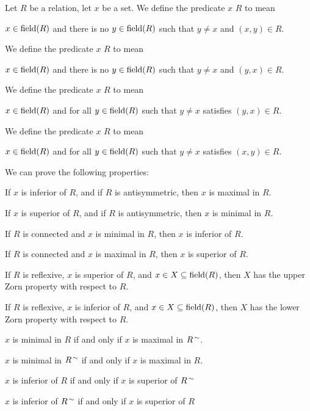 \documentclass{article}
\begin{document}
\begin{definition}%
%
Let $R$ be a relation, let $x$ be a set.
We define the predicate $x$  $R$ to mean
\begin{defn}
\item $x\in\operatorname{field}(R)$ and there is no $y\in\operatorname{field}(R)$ such that $y\neq x$
  and $(x,y)\in R$.
\end{defn}
We define the predicate $x$  $R$ to mean
\begin{defn}
\item $x\in\operatorname{field}(R)$ and there is no $y\in\operatorname{field}(R)$ such that $y\neq x$
  and $(y,x)\in R$.
\end{defn}
We define the predicate $x$  $R$ to mean
\begin{defn}
\item $x\in\operatorname{field}(R)$ and for all $y\in\operatorname{field}(R)$ such that $y\neq x$
  satisfies $(y,x)\in R$.
\end{defn}
We define the predicate $x$  $R$ to mean
\begin{defn}
\item $x\in\operatorname{field}(R)$ and for all $y\in\operatorname{field}(R)$ such that $y\neq x$
  satisfies $(x,y)\in R$.
\end{defn}
\end{definition}

We can prove the following properties:
\begin{thm}
\item\label{orders1:53} If $x$ is inferior of $R$, and if $R$ is
  antisymmetric, then $x$ is maximal in $R$.
\item\label{orders1:54} If $x$ is superior of $R$, and if $R$ is
  antisymmetric, then $x$ is minimal in $R$.
\item\label{orders1:55} If $R$ is connected and $x$ is minimal in $R$,
  then $x$ is inferior of $R$.
\item\label{orders1:56} If $R$ is connected and $x$ is maximal in $R$,
  then $x$ is superior of $R$.
\item\label{orders1:57} If $R$ is reflexive, $x$ is superior of $R$, and
  $x\in X\subseteq\operatorname{field}(R)$, then $X$ has the upper Zorn property with
  respect to $R$.
\item\label{orders1:58} If $R$ is reflexive, $x$ is inferior of $R$, and
  $x\in X\subseteq\operatorname{field}(R)$, then $X$ has the lower Zorn property with
  respect to $R$.
\item\label{orders1:59} $x$ is minimal in $R$ if and only if $x$ is
  maximal in $R^{\,\sim}$.
\item\label{orders1:60} $x$ is minimal in $R^{\,\sim}$ if and only if
  $x$ is maximal in $R$.
\item\label{orders1:61} $x$ is inferior of $R$ if and only if $x$ is
  superior of $R^{\,\sim}$
\item\label{orders1:62} $x$ is inferior of $R^{\,\sim}$ if and only if $x$ is
  superior of $R$
\end{thm}
\end{document}
